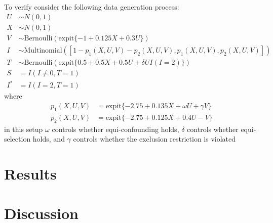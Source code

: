 \documentclass[11pt]{article}
\begin{document}
To verify consider the following data generation process:
    \begin{align*}
        U &\sim N(0,1)\\
        X &\sim N(0,1)\\
        V &\sim \text{Bernoulli}(\text{expit}\{-1 + 0.125 X + 0.3 U\})\\
        I &\sim \text{Multinomial}([1 - p_1(X,U,V) - p_2(X,U,V), p_1(X, U,V), p_2(X,U,V)])\\
        T &\sim \text{Bernoulli}(\text{expit}\{0.5 + 0.5 X + 0.5 U + \delta U I(I = 2)\}) \\
        S &= I(I \neq 0, T = 1) \\
        I^* &= I(I = 2, T = 1)
    \end{align*}
    where 
    \begin{align*}
        p_1(X,U,V) &= \text{expit}\{-2.75 + 0.135 X + \omega U + \gamma V\} \\
        p_2(X,U,V) & = \text{expit}\{-2.75 + 0.125 X + 0.4 U - V\}
    \end{align*}
    in this setup $\omega$ controls whether equi-confounding holds, $\delta$ controls whether equi-selection holds, and $\gamma$ controls whether the exclusion restriction is violated
\section{Results} \label{sec:results}

\section{Discussion} \label{sec:discussion}
\end{document}
